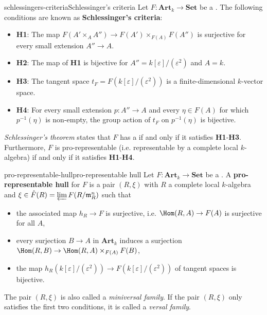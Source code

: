 \begin{topic}{schlessingers-criteria}{Schlessinger's criteria}
    Let $F : \textbf{Art}_k \to \textbf{Set}$ be a . The following conditions are known as \textbf{Schlessinger's criteria}:
    \begin{itemize}
        \item \textbf{H1}: The map $F(A' \times_A A'') \to F(A') \times_{F(A)} F(A'')$ is surjective for every small extension $A'' \to A$.
        \item \textbf{H2}: The map of \textbf{H1} is bijective for $A'' = k[\varepsilon] / (\varepsilon^2)$ and $A = k$.
        \item \textbf{H3}: The tangent space $t_F = F(k[\varepsilon]/(\varepsilon^2))$ is a finite-dimensional $k$-vector space.
        \item \textbf{H4}: For every small extension $p : A'' \to A$ and every $\eta \in F(A)$ for which $p^{-1}(\eta)$ is non-empty, the group action of $t_F$ on $p^{-1}(\eta)$ is bijective.
    \end{itemize}
    \textit{Schlessinger's theorem} states that $F$ has a  if and only if it satisfies \textbf{H1}-\textbf{H3}. Furthermore, $F$ is pro-representable (i.e. representable by a complete local $k$-algebra) if and only if it satisfies \textbf{H1}-\textbf{H4}.
\end{topic}

\begin{topic}{pro-representable-hull}{pro-representable hull}
    Let $F : \textbf{Art}_k \to \textbf{Set}$ be a .
    A \textbf{pro-representable hull} for $F$ is a pair $(R, \xi)$ with $R$ a complete local $k$-algebra and $\xi \in \hat{F}(R) = \varprojlim F(R / \mathfrak{m}_R^n)$ such that
    \begin{itemize}
        \item the associated map $h_R \to F$ is surjective, i.e. $\Hom(R, A) \to F(A)$ is surjective for all $A$,
        \item every surjection $B \to A$ in $\textbf{Art}_k$ induces a surjection $\Hom(R, B) \to \Hom(R, A) \times_{F(A)} F(B)$,
        \item the map $h_R(k[\varepsilon]/(\varepsilon^2)) \to F(k[\varepsilon]/(\varepsilon^2))$ of tangent spaces is bijective.
    \end{itemize}
    The pair $(R, \xi)$ is also called a \textit{miniversal family}. If the pair $(R, \xi)$ only satisfies the first two conditions, it is called a \textit{versal family}.
\end{topic}

